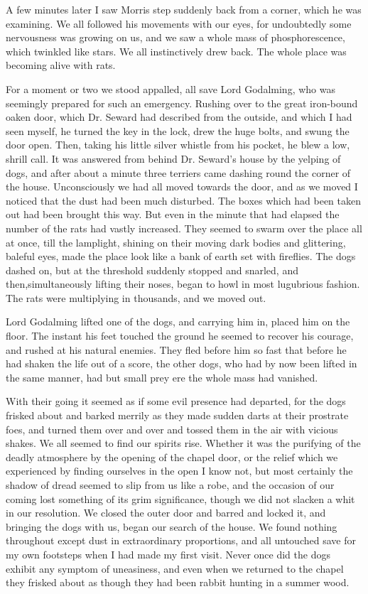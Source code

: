 A few minutes later I saw Morris step suddenly back from a corner, which he was examining. We all followed his movements with our eyes, for undoubtedly some nervousness was growing on us, and we saw a whole mass of phosphorescence, which twinkled like stars. We all instinctively drew back. The whole place was becoming alive with rats. 

For a moment or two we stood appalled, all save Lord Godalming, who was seemingly prepared for such an emergency. Rushing over to the great iron-bound oaken door, which Dr. Seward had described from the outside, and which I had seen myself, he turned the key in the lock, drew the huge bolts, and swung the door open. Then, taking his little silver whistle from his pocket, he blew a low, shrill call. It was answered from behind Dr. Seward's house by the yelping of dogs, and after about a minute three terriers came dashing round the corner of the house. Unconsciously we had all moved towards the door, and as we moved I noticed that the dust had been much disturbed. The boxes which had been taken out had been brought this way. But even in the minute that had elapsed the number of the rats had vastly increased. They seemed to swarm over the place all at once, till the lamplight, shining on their moving dark bodies and glittering, baleful eyes, made the place look like a bank of earth set with fireflies. The dogs dashed on, but at the threshold suddenly stopped and snarled, and then,simultaneously lifting their noses, began to howl in most lugubrious fashion. The rats were multiplying in thousands, and we moved out. 

Lord Godalming lifted one of the dogs, and carrying him in, placed him on the floor. The instant his feet touched the ground he seemed to recover his courage, and rushed at his natural enemies. They fled before him so fast that before he had shaken the life out of a score, the other dogs, who had by now been lifted in the same manner, had but small prey ere the whole mass had vanished. 

With their going it seemed as if some evil presence had departed, for the dogs frisked about and barked merrily as they made sudden darts at their prostrate foes, and turned them over and over and tossed them in the air with vicious shakes. We all seemed to find our spirits rise. Whether it was the purifying of the deadly atmosphere by the opening of the chapel door, or the relief which we experienced by finding ourselves in the open I know not, but most certainly the shadow of dread seemed to slip from us like a robe, and the occasion of our coming lost something of its grim significance, though we did not slacken a whit in our resolution. We closed the outer door and barred and locked it, and bringing the dogs with us, began our search of the house. We found nothing throughout except dust in extraordinary proportions, and all untouched save for my own footsteps when I had made my first visit. Never once did the dogs exhibit any symptom of uneasiness, and even when we returned to the chapel they frisked about as though they had been rabbit hunting in a summer wood. 

